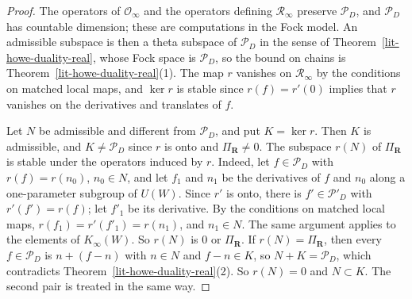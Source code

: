 \begin{proof}
The operators of $\mathcal O_\infty$ and the operators defining
$\mathcal R_\infty$ preserve $\mathcal P_D$, and $\mathcal P_D$ has countable
dimension; these are computations in the Fock model. An admissible subspace is
then a theta subspace of $\mathcal P_D$ in the sense of
Theorem~\ref{lit-howe-duality-real}, whose Fock space is $\mathcal P_D$, so
the bound on chains is Theorem~\ref{lit-howe-duality-real}(1). The map $r$
vanishes on $\mathcal R_\infty$ by the conditions on matched local maps, and
$\ker r$ is stable since $r(f)=r'(0)$ implies that $r$ vanishes on the
derivatives and translates of $f$.

Let $N$ be admissible and different from $\mathcal P_D$, and put
$K=\ker r$. Then $K$ is admissible, and $K\neq\mathcal P_D$ since $r$ is onto
and $\Pi_{\mathbf R}\neq0$. The subspace $r(N)$ of $\Pi_{\mathbf R}$ is stable
under the operators induced by $r$. Indeed, let $f\in\mathcal P_D$ with
$r(f)=r(n_0)$, $n_0\in N$, and let $f_1$ and $n_1$ be the derivatives of $f$
and $n_0$ along a one-parameter subgroup of $U(W)$. Since $r'$ is onto, there
is $f'\in\mathcal P'_D$ with $r'(f')=r(f)$; let $f'_1$ be its derivative. By
the conditions on matched local maps, $r(f_1)=r'(f'_1)=r(n_1)$, and
$n_1\in N$. The same argument applies to the elements of $K_\infty(W)$. So
$r(N)$ is $0$ or $\Pi_{\mathbf R}$. If $r(N)=\Pi_{\mathbf R}$, then every
$f\in\mathcal P_D$ is $n+(f-n)$ with $n\in N$ and $f-n\in K$, so
$N+K=\mathcal P_D$, which contradicts
Theorem~\ref{lit-howe-duality-real}(2). So $r(N)=0$ and $N\subset K$. The
second pair is treated in the same way.
\end{proof}

